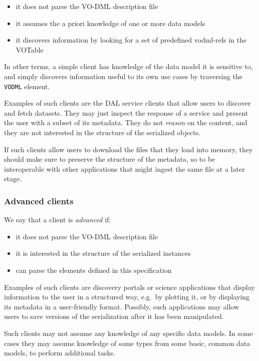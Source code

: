 \documentclass[11pt,a4paper]{ivoa}
\begin{document}
\begin{itemize}
\item
  it does not parse the VO-DML description file
\item
  it assumes the a priori knowledge of one or more data models
\item
  it discovers information by looking for a set of predefined vodml-refs
  in the VOTable
\end{itemize}

In other terms, a simple client has knowledge of the data model it is
sensitive to, and simply discovers information useful to its own use
cases by traversing the \texttt{VODML} element.

Examples of such clients are the DAL service clients that allow users to
discover and fetch datasets. They may just inspect the response of a
service and present the user with a subset of its metadata. They do not
\emph{reason} on the content, and they are not interested in the
structure of the serialized objects.

If such clients allow users to download the files that they load into
memory, they should make sure to preserve the structure of the metadata,
so to be interoperable with other applications that might ingest the
same file at a later stage.

\subsubsection{Advanced clients}\label{advanced-clients}

We say that a client is \emph{advanced} if:

\begin{itemize}
\item
  it does not parse the VO-DML description file
\item
  it is interested in the structure of the serialized instances
\item
  can parse the elements defined in this specification
\end{itemize}

Examples of such clients are discovery portals or science applications
that display information to the user in a structured way, e.g.~by
plotting it, or by displaying its metadata in a user-friendly format.
Possibly, such applications may allow users to save versions of the
serialization after it has been manipulated.

Such clients may not assume any knowledge of any specific data models.
In some cases they may assume knowledge of some types from some basic,
common data models, to perform additional tasks.
\end{document}
